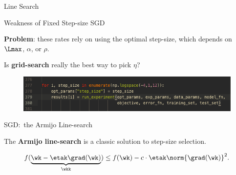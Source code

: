 \documentclass[mathserif,notheorems, hyperref={colorlinks, citecolor=blue, urlcolor=blue, linkcolor=blue}]{beamer}
\def\\{}%
\begin{document}
\begin{frame}
	\begin{center}
		\huge Line Search\\
	\end{center}
\end{frame}


\begin{frame}{Weakness of Fixed Step-size SGD}
	\begin{center}
		\Large
		\textbf{Problem}: these rates rely on using the optimal step-size,
		which depends on \( \Lmax \), \( \alpha \), or \( \rho \). \\

		\vspace{3ex}
		Is \textbf{grid-search} really the best way to pick \( \eta \)?
	\end{center}

	\begin{figure}[]
		\centering
		\includegraphics[width=\linewidth]{figures/grid_search}
	\end{figure}

\end{frame}

\begin{frame}{SGD:\ the Armijo Line-search}

	The \textbf{Armijo line-search} is a classic solution to step-size selection.

	\[ f(\underbrace{\wk - \etak \grad(\wk)}_{\wkk}) \leq f(\wk) - c\cdot \etak \norm{\grad(\wk)}^2. \]
	\vspace{1.2ex}

	\begin{figure}[]
		\centering
		
	\end{figure}
\end{frame}
\end{document}
